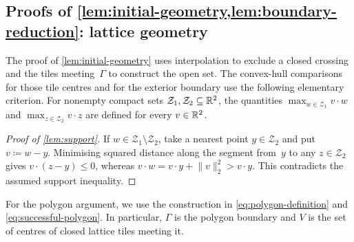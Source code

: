 \documentclass[11pt,letterpaper]{article}
\begin{document}
\subsection{Proofs of \texorpdfstring{\cref{lem:initial-geometry,lem:boundary-reduction}}{the geometric lemmas}: lattice geometry}
\label{sec:geometry}

The proof of \cref{lem:initial-geometry} uses interpolation to exclude a closed crossing and the tiles meeting~$\Gamma$ to construct the open set. The convex-hull comparisons for those tile centres and for the exterior boundary use the following elementary criterion. For nonempty compact sets $\mathcal Z_1,\mathcal Z_2\subseteq\mathbb R^2$, the quantities $\max_{w\in \mathcal Z_1}v\cdot w$ and $\max_{z\in \mathcal Z_2}v\cdot z$ are defined for every $v\in\mathbb R^2$.


\begin{proof}[Proof of \cref{lem:support}]
If $w\in \mathcal Z_1\setminus \mathcal Z_2$, take a nearest point $y\in \mathcal Z_2$ and put $v\coloneqq w-y$. Minimising squared distance along the segment from~$y$ to any $z\in \mathcal Z_2$ gives $v\cdot(z-y)\le0$, whereas $v\cdot w=v\cdot y+\lVert v\rVert_2^2>v\cdot y$. This contradicts the assumed support inequality.
\end{proof}

For the polygon argument, we use the construction in \eqref{eq:polygon-definition} and \eqref{eq:successful-polygon}. In particular, $\Gamma$ is the polygon boundary and $V$ is the set of centres of closed lattice tiles meeting it.
\end{document}
